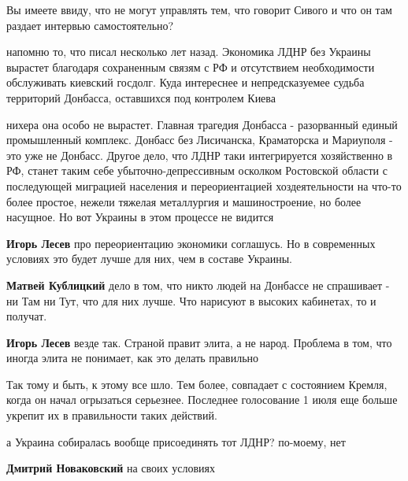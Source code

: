 \begin{itemize}
\begin{itemize} %
Вы имеете ввиду, что не могут управлять тем, что говорит Сивого и что он там раздает интервью самостоятельно?
\end{itemize} %


напомню то, что писал несколько лет назад. Экономика ЛДНР без Украины вырастет
благодаря сохраненным связям с РФ и отсутствием необходимости обслуживать
киевский госдолг. Куда интереснее и непредсказуемее судьба территорий Донбасса,
оставшихся под контролем Киева

\begin{itemize} %

нихера она особо не вырастет. Главная трагедия Донбасса - разорванный единый
промышленный комплекс. Донбасс без Лисичанска, Краматорска и Мариуполя - это
уже не Донбасс. Другое дело, что ЛДНР таки интегрируется хозяйственно в РФ,
станет таким себе убыточно-депрессивным осколком Ростовской области с
последующей миграцией населения и переориентацией хоздеятельности на что-то
более простое, нежели тяжелая металлургия и машиностроение, но более насущное.
Но вот Украины в этом процессе не видится

\textbf{Игорь Лесев} про переориентацию экономики соглашусь. Но в современных условиях это будет лучше для них, чем в составе Украины.

\textbf{Матвей Кублицкий} дело в том, что никто людей на Донбассе не спрашивает - ни Там ни Тут, что для них лучше. Что нарисуют в высоких кабинетах, то и получат.

\textbf{Игорь Лесев} везде так. Страной правит элита, а не народ. Проблема в том, что иногда элита не понимает, как это делать правильно
\end{itemize} %

Так тому и быть, к этому все шло.
Тем более, совпадает с состоянием Кремля, когда он начал огрызаться серьезнее.
Последнее голосование 1 июля еще больше укрепит их в правильности таких действий.

а Украина собиралась вообще присоединять тот ЛДНР? по-моему, нет

\begin{itemize} %
\textbf{Дмитрий Новаковский} на своих условиях
\end{itemize} %


\end{itemize}
